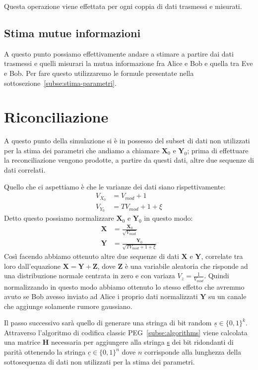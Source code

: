 Questa operazione viene effettata per ogni coppia di dati trasmessi e misurati.

\subsection{Stima mutue informazioni}
A questo punto possiamo effettivamente andare a stimare a partire dai dati trasmessi e quelli misurari la mutua informazione fra Alice e Bob e quella tra Eve e Bob. Per fare questo utilizzaremo le formule presentate nella sottosezione~\ref{subse:stima-parametri}. 

\section{Riconciliazione}
A questo punto della simulazione si \`e in possesso del subset di dati non utilizzati per la stima dei parametri che andiamo a chiamare $\textbf{X}_0$ e $\textbf{Y}_0$; prima di effettuare la reconciliazione vengono prodotte, a partire da questi dati, altre due sequenze di dati correlati. 

Quello che ci aspettiamo \`e che le varianze dei dati siano rispettivamente:
\begin{equation}
\begin{split}
V_{X_0} &= V_{mod} + 1 \\
V_{Y_0} &= T V_{mod} + 1 + \xi
\end{split}
\end{equation}
Detto questo possiamo normalizzare $\textbf{X}_0$ e $\textbf{Y}_0$ in questo modo:
\begin{equation}
\begin{split}
\textbf{X} &= \frac{\textbf{X}_0}{\sqrt{V_{mod}}}\\
\textbf{Y} &= \frac{\textbf{Y}_0}{\sqrt{T V_{mod} + 1 + \xi}}
\end{split}
\end{equation}
Cos\`i facendo abbiamo ottenuto altre due sequenze di dati $\textbf{X}$ e $\textbf{Y}$, correlate tra loro dall'equazione $\textbf{X} = \textbf{Y} + \textbf{Z}$, dove $\textbf{Z}$ \`e una variabile aleatoria che risponde ad una distribuzione normale centrata in zero e con variaza $V_z = \frac{1}{V_{mod}}$. Quindi normalizzando in questo modo abbiamo ottenuto lo stesso effetto che avremmo avuto se Bob avesso inviato ad Alice i proprio dati normalizzati $\textbf{Y}$ su un canale che aggiunge solamente rumore gaussiano\cite{milicevic_key_2018}.

Il passo successivo sar\`a quello di generare una stringa di bit random $\underline{s} \in \{0,1\}^k$. Attraverso l'algoritmo di codifica classic PEG~\ref{subse:algorithms} viene calcolata una matrice \textbf{H} necessaria per aggiungere alla stringa \underline{s} dei bit ridondanti di parit\`a ottenendo la stringa $\underline{c} \in \{0,1\}^n$ dove $n$ corrisponde alla lunghezza della sottosequenza di dati non utilizzati per la stima dei parametri.

